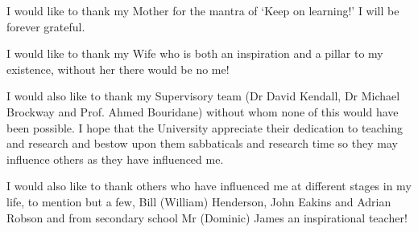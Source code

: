 \begin{acknowledgements}
I would like to thank my Mother for the mantra of `Keep on learning!' I will be forever grateful.

I would like to thank my Wife who is both an inspiration and a pillar to my existence, without her there would be no me!

I would also like to thank my Supervisory team (Dr David Kendall, Dr Michael Brockway and Prof. Ahmed Bouridane) without whom none of this would have been possible. I hope that the University appreciate their dedication to teaching and research and bestow upon them sabbaticals and research time so they may influence others as they have influenced me.

I would also like to thank others who have influenced me at different stages in my life, to mention but a few, Bill (William) Henderson, John Eakins and Adrian Robson and from secondary school Mr (Dominic) James an inspirational teacher!
\end{acknowledgements}
